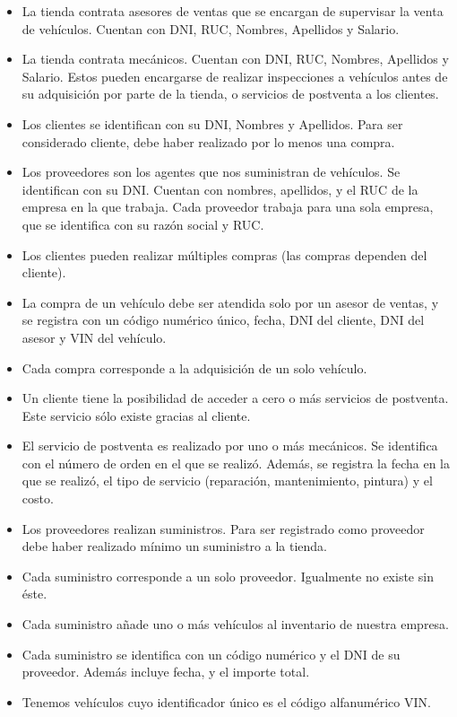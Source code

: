 \documentclass[12pt]{article}
\begin{document}
\begin{itemize}
\item La tienda contrata asesores de ventas que se encargan de supervisar la venta de vehículos. Cuentan con DNI, RUC, Nombres, Apellidos y Salario.
\item La tienda contrata mecánicos. Cuentan con DNI, RUC, Nombres, Apellidos y Salario. Estos pueden encargarse de realizar inspecciones a vehículos antes de su adquisición por parte de la tienda, o servicios de postventa a los clientes.
\item Los clientes se identifican con su DNI, Nombres y Apellidos. Para ser considerado cliente, debe haber realizado por lo menos una compra.
\item Los proveedores son los agentes que nos suministran de vehículos. Se identifican con su DNI. Cuentan con nombres, apellidos, y el RUC de la empresa en la que trabaja. Cada proveedor trabaja para una sola empresa, que se identifica con su razón social y RUC.
\item Los clientes pueden realizar múltiples compras (las compras dependen del cliente).
\item La compra de un vehículo debe ser atendida solo por un asesor de ventas, y se registra con un código numérico único, fecha, DNI del cliente, DNI del asesor y VIN del vehículo.
\item Cada compra corresponde a la adquisición de un solo vehículo.
\item Un cliente tiene la posibilidad de acceder a cero o más servicios de postventa. Este servicio sólo existe gracias al cliente.
\item El servicio de postventa es realizado por uno o más mecánicos. Se identifica con el número de orden en el que se realizó. Además, se registra la fecha en la que se realizó, el tipo de servicio (reparación, mantenimiento, pintura) y el costo.
\item Los proveedores realizan suministros. Para ser registrado como proveedor debe haber realizado mínimo un suministro a la tienda.
\item Cada suministro corresponde a un solo proveedor. Igualmente no existe sin éste.
\item Cada suministro añade uno o más vehículos al inventario de nuestra empresa.
\item Cada suministro se identifica con un código numérico y el DNI de su proveedor. Además incluye fecha, y el importe total.
\item Tenemos vehículos cuyo identificador único es el código alfanumérico VIN.

\end{itemize}
\end{document}
